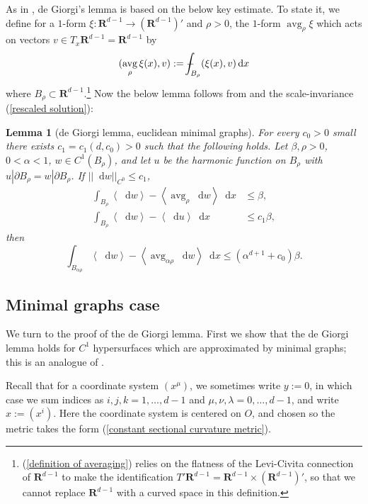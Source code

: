 \documentclass[reqno,10pt]{amsart}
\newcommand{\RR}{\mathbf{R}}
\DeclareMathOperator{\avg}{avg}
\newcommand*\dif{\mathop{}\!\mathrm{d}}
\def\Japan#1{\left \langle #1 \right \rangle}
\newtheorem{lemma}[theorem]{Lemma}
\theoremstyle{definition}
\numberwithin{equation}{section}
\def\Xint#1{\mathchoice
{\XXint\displaystyle\textstyle{#1}}%
{\XXint\textstyle\scriptstyle{#1}}%
{\XXint\scriptstyle\scriptscriptstyle{#1}}%
{\XXint\scriptscriptstyle\scriptscriptstyle{#1}}%
\!\int}
\def\XXint#1#2#3{{\setbox0=\hbox{$#1{#2#3}{\int}$ }
\vcenter{\hbox{$#2#3$ }}\kern-.6\wd0}}
\def\dashint{\Xint-}
\begin{document}
As in \cite{deGiorgi61, Miranda66}, de Giorgi's lemma is based on the below key estimate.
To state it, we define for a $1$-form $\xi: \RR^{d - 1} \to (\RR^{d - 1})'$ and $\rho > 0$, the $1$-form $\avg_\rho \xi$ which acts on vectors $v \in T_x\RR^{d - 1} = \RR^{d - 1}$ by
\begin{equation}\label{definition of averaging}
(\avg_\rho \xi(x), v) := \dashint_{B_\rho} (\xi(x), v) \dif x
\end{equation}
where $B_\rho \subset \RR^{d - 1}$.\footnote{(\ref{definition of averaging}) relies on the flatness of the Levi-Civita connection of $\RR^{d - 1}$ to make the identification $T'\RR^{d - 1} = \RR^{d - 1} \times (\RR^{d - 1})'$, so that we cannot replace $\RR^{d - 1}$ with a curved space in this definition.}
Now the below lemma follows from \cite[Lemma 4.2]{Miranda66} and the scale-invariance (\ref{rescaled solution}):

\begin{lemma}[de Giorgi lemma, euclidean minimal graphs]\label{Miranda42 quant}
For every $c_0 > 0$ small there exists $c_1 = c_1(d, c_0) > 0$ such that the following holds.
Let $\beta, \rho > 0$, $0 < \alpha < 1$, $w \in C^1(B_\rho)$, and let $u$ be the harmonic function on $B_\rho$ with $u|\partial B_\rho = w|\partial B_\rho$.
If $||\dif w||_{C^0} \leq c_1$,
\begin{align}
\int_{B_\rho} \Japan{\dif w} - \Japan{\avg_\rho \dif w} \dif x &\leq \beta, \label{Miranda42 hyp} \\
\int_{B_\rho} \Japan{\dif w} - \Japan{\dif u} \dif x &\leq c_1 \beta,
\end{align}
then 
\begin{equation}\label{Miranda42 concl}
\int_{B_{\alpha \rho}} \Japan{\dif w} - \Japan{\avg_{\alpha \rho} \dif w} \dif x \leq (\alpha^{d + 1} + c_0) \beta.
\end{equation}
\end{lemma}

\subsection{Minimal graphs case}
We turn to the proof of the de Giorgi lemma.
First we show that the de Giorgi lemma holds for $C^1$ hypersurfaces which are approximated by minimal graphs; this is an analogue of \cite[Teorema 4.3]{Miranda66}.

Recall that for a coordinate system $(x^\mu)$, we sometimes write $y := 0$, in which case we sum indices as $i, j, k = 1, \dots, d - 1$ and $\mu, \nu, \lambda = 0, \dots, d - 1$, and write $x := (x^i)$.
Here the coordinate system is centered on $O$, and chosen so the metric takes the form (\ref{constant sectional curvature metric}).
\end{document}
